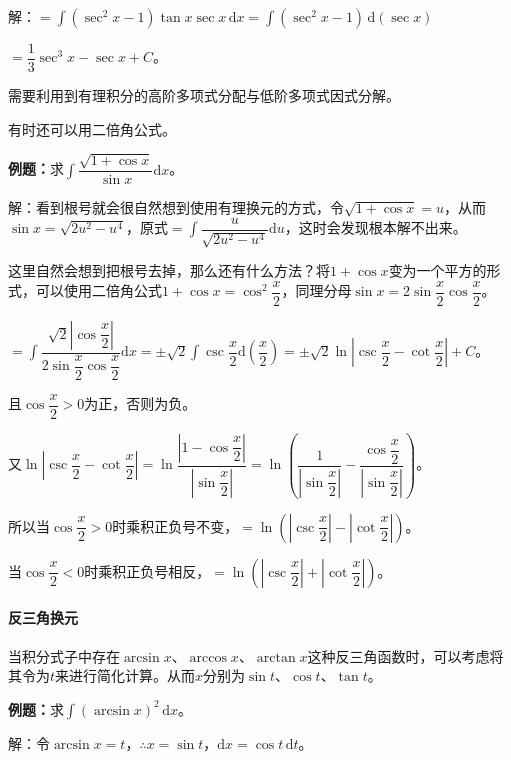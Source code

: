 \documentclass[UTF8, 12pt]{ctexart}
\begin{document}
解：$=\displaystyle{\int(\sec^2x-1)}\tan x\sec x\,\textrm{d}x=\displaystyle{\int(\sec^2x-1)}\,\textrm{d}(\sec x)$

$=\dfrac{1}{3}\sec^3x-\sec x+C$。

需要利用到有理积分的高阶多项式分配与低阶多项式因式分解。

有时还可以用二倍角公式。\medskip

\textbf{例题：}求$\displaystyle{\int\dfrac{\sqrt{1+\cos x}}{\sin x}\textrm{d}x}$。

解：看到根号就会很自然想到使用有理换元的方式，令$\sqrt{1+\cos x}=u$，从而$\sin x=\sqrt{2u^2-u^4}$，原式$=\displaystyle{\int\dfrac{u}{\sqrt{2u^2-u^4}}\textrm{d}u}$，这时会发现根本解不出来。

这里自然会想到把根号去掉，那么还有什么方法？将$1+\cos x$变为一个平方的形式，可以使用二倍角公式$1+\cos x=\cos^2\dfrac{x}{2}$，同理分母$\sin x=2\sin\dfrac{x}{2}\cos\dfrac{x}{2}$。

$=\displaystyle{\int\dfrac{\sqrt{2}\left\vert\cos\dfrac{x}{2}\right\vert}{2\sin\dfrac{x}{2}\cos\dfrac{x}{2}}\textrm{d}x=\pm\sqrt{2}\int\csc\dfrac{x}{2}\textrm{d}\left(\dfrac{x}{2}\right)=\pm\sqrt{2}\ln\left\vert\csc\dfrac{x}{2}-\cot\dfrac{x}{2}\right\vert+C}$。

且$\cos\dfrac{x}{2}>0$为正，否则为负。

又$\ln\left\vert\csc\dfrac{x}{2}-\cot\dfrac{x}{2}\right\vert=\ln\dfrac{\left\vert1-\cos\dfrac{x}{2}\right\vert}{\left\vert\sin\dfrac{x}{2}\right\vert}=\ln\left(\dfrac{1}{\left\vert\sin\dfrac{x}{2}\right\vert}-\dfrac{\cos\dfrac{x}{2}}{\left\vert\sin\dfrac{x}{2}\right\vert}\right)$。\medskip

所以当$\cos\dfrac{x}{2}>0$时乘积正负号不变，$=\ln\left(\left\vert\csc\dfrac{x}{2}\right\vert-\left\vert\cot\dfrac{x}{2}\right\vert\right)$。

当$\cos\dfrac{x}{2}<0$时乘积正负号相反，$=\ln\left(\left\vert\csc\dfrac{x}{2}\right\vert+\left\vert\cot\dfrac{x}{2}\right\vert\right)$。

\paragraph{反三角换元} \leavevmode \medskip

当积分式子中存在$\arcsin x$、$\arccos x$、$\arctan x$这种反三角函数时，可以考虑将其令为$t$来进行简化计算。从而$x$分别为$\sin t$、$\cos t$、$\tan t$。

\textbf{例题：}求$\int(\arcsin x)^2\,\textrm{d}x$。

解：令$\arcsin x=t$，$\therefore x=\sin t$，$\textrm{d}x=\cos t\,\textrm{d}t$。
\end{document}
